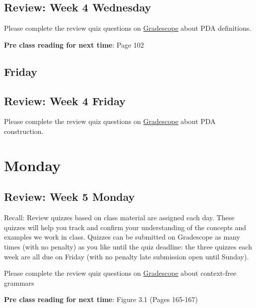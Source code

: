 

\subsection*{Review: Week 4 Wednesday}

Please complete the review quiz questions on \href{http://gradescope.com}{Gradescope} about 
PDA definitions.

{\bf Pre class reading for next time}: Page 102



\newpage
\subsection*{Friday}



\newpage
\subsection*{Review: Week 4 Friday}


Please complete the review quiz questions on \href{http://gradescope.com}{Gradescope} about 
PDA construction.


\newpage

\section*{Monday}


    
\newpage
\subsection*{Review: Week 5 Monday}


Recall: Review quizzes based on class material are assigned each day. 
These quizzes will help you track and confirm your understanding of the concepts and examples 
we work in class. Quizzes can be submitted on Gradescope as many times (with no penalty) as 
you like until the quiz deadline: the three quizzes each week are all due on Friday (with no penalty 
late submission open until Sunday).

Please complete the review quiz questions on \href{http://gradescope.com}{Gradescope} about 
context-free grammars

{\bf Pre class reading for next time}: Figure 3.1 (Pages 165-167)

